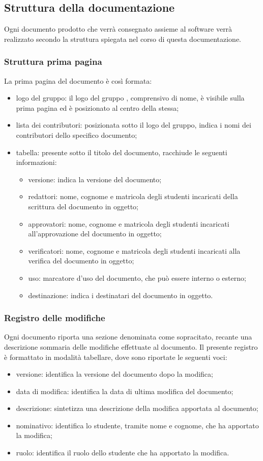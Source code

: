 \subsection{Struttura della documentazione}
Ogni documento prodotto che verrà consegnato assieme al software \NomeProgetto{} verrà realizzato secondo la struttura spiegata nel corso di questa documentazione.

\subsubsection{Struttura prima pagina}
La prima pagina del documento è così formata:
\begin{itemize}
	\item logo del gruppo: il logo del gruppo {\Gruppo}, comprensivo di nome, è visibile sulla prima pagina ed è posizionato al centro della stessa;
	\item lista dei contributori: posizionata sotto il logo del gruppo, indica i nomi dei contributori dello specifico documento;
	\item tabella: presente sotto il titolo del documento, racchiude le seguenti informazioni:
	\begin{itemize}
		\item versione: indica la versione del documento;
		\item redattori: nome, cognome e matricola degli studenti incaricati della scrittura del documento in oggetto;
		\item approvatori: nome, cognome e matricola degli studenti incaricati all’approvazione del documento in oggetto;
		\item verificatori: nome, cognome e matricola degli studenti incaricati alla verifica del documento in oggetto;
		\item uso: marcatore d’uso del documento, che può essere interno o esterno;
		\item destinazione: indica i destinatari del documento in oggetto.
		\end{itemize}
	\end{itemize}
	
\subsubsection{Registro delle modifiche}
Ogni documento riporta una sezione denominata come sopracitato, recante una descrizione sommaria delle modifiche effettuate al documento. Il presente registro è formattato in modalità tabellare, dove sono riportate le seguenti voci:	
\begin{itemize}
	\item versione: identifica la versione del documento dopo la modifica;
	\item data di modifica: identifica la data di ultima modifica del documento;
	\item descrizione: sintetizza una descrizione della modifica apportata al documento;
	\item nominativo: identifica lo studente, tramite nome e cognome, che ha apportato la modifica;
	\item ruolo: identifica il ruolo dello studente che ha apportato la modifica.
\end{itemize}

